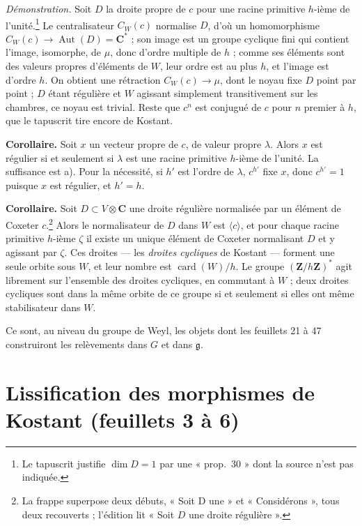 \documentclass[11pt,a4paper]{article}
\begin{document}
\emph{Démonstration.} Soit $D$ la droite propre de $c$ pour une racine
primitive $h$-ième de l'unité.\footnote{Le tapuscrit justifie $\dim D=1$ par une
« prop.\ 30 » dont la source n'est pas indiquée.} Le centralisateur
$C_{W}(c)$ normalise $D$, d'où un homomorphisme
$C_{W}(c)\to\operatorname{Aut}(D)=\mathbf{C}^{*}$ ; son image est
un groupe cyclique fini qui contient l'image, isomorphe, de $\mu$, donc d'ordre
multiple de $h$ ; comme ses éléments sont des valeurs propres d'éléments de
$W$, leur ordre est au plus $h$, et l'image est d'ordre $h$. On obtient une
rétraction $C_{W}(c)\to\mu$, dont le noyau fixe $D$ point par point
; $D$ étant régulière et $W$ agissant simplement transitivement sur les
chambres, ce noyau est trivial. Reste que $c^{n}$ est conjugué de $c$ pour $n$
premier à $h$, que le tapuscrit tire encore de Kostant.

\textbf{Corollaire.} Soit $x$ un vecteur propre de $c$, de valeur propre
$\lambda$. Alors $x$ est régulier si et seulement si $\lambda$ est une racine
primitive $h$-ième de l'unité. La suffisance est a). Pour la nécessité, si
$h'$ est l'ordre de $\lambda$, $c^{h'}$ fixe $x$, donc $c^{h'}=1$ puisque $x$
est régulier, et $h'=h$.

\textbf{Corollaire.} Soit $D\subset V\otimes\mathbf{C}$ une droite régulière
normalisée par un élément de Coxeter $c$.\footnote{La frappe superpose deux
débuts, « Soit D une » et « Considérons », tous deux recouverts ; l'édition lit
« Soit $D$ une droite régulière ».} Alors le normalisateur de $D$ dans $W$ est
$\langle c\rangle$, et pour chaque racine primitive $h$-ième $\zeta$ il existe
un unique élément de Coxeter normalisant $D$ et y agissant par $\zeta$. Ces
droites — les \emph{droites cycliques} de Kostant — forment une seule orbite
sous $W$, et leur nombre est $\operatorname{card}(W)/h$. Le groupe
$(\mathbf{Z}/h\mathbf{Z})^{*}$ agit librement sur l'ensemble des droites
cycliques, en commutant à $W$ ; deux droites cycliques sont dans la même orbite
de ce groupe si et seulement si elles ont même stabilisateur dans $W$.

Ce sont, au niveau du groupe de Weyl, les objets dont les feuillets 21 à 47
construiront les relèvements dans $G$ et dans $\mathfrak{g}$.

\section*{Lissification des morphismes de Kostant (feuillets 3 à 6)}

\end{document}

